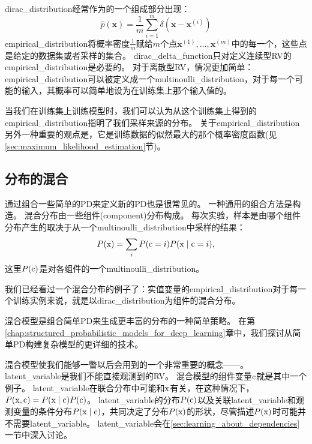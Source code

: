 \gls{dirac_distribution}经常作为的一个组成部分出现：
\begin{equation}
\hat{p}(\bm{x}) = \frac{1}{m} \sum_{i=1}^m \delta(\bm{x} - \bm{x}^{(i)})
\end{equation}
\gls{empirical_distribution}将概率密度$\frac{1}{m}$赋给$m$个点$\bm{x}^{(1)}, \ldots, \bm{x}^{(m)}$中的每一个，这些点是给定的数据集或者采样的集合。
\gls{dirac_delta_function}只对定义连续型\gls{RV}的\gls{empirical_distribution}是必要的。
对于离散型\gls{RV}，情况更加简单：\gls{empirical_distribution}可以被定义成一个\gls{multinoulli_distribution}，对于每一个可能的输入，其概率可以简单地设为在训练集上那个输入值的。

当我们在训练集上训练模型时，我们可以认为从这个训练集上得到的\gls{empirical_distribution}指明了我们采样来源的分布。
关于\gls{empirical_distribution}另外一种重要的观点是，它是训练数据的似然最大的那个概率密度函数(见\ref{sec:maximum_likelihood_estimation}节)。

\subsection{分布的混合}
\label{sec:mixtures_of_distributions}

通过组合一些简单的\gls{PD}来定义新的\gls{PD}也是很常见的。
一种通用的组合方法是构造。
混合分布由一些组件(component)分布构成。
每次实验，样本是由哪个组件分布产生的取决于从一个\gls{multinoulli_distribution}中采样的结果：
\begin{equation}
P(\mathrm{x}) = \sum_i P(\mathrm{c} = i) P(\mathrm{x} \mid \mathrm{c} = i),
\end{equation}
这里$P(\mathrm{c})$是对各组件的一个\gls{multinoulli_distribution}。

我们已经看过一个混合分布的例子了：实值变量的\gls{empirical_distribution}对于每一个训练实例来说，就是以\gls{dirac_distribution}为组件的混合分布。


混合模型是组合简单\gls{PD}来生成更丰富的分布的一种简单策略。
在第\ref{chap:structured_probabilistic_models_for_deep_learning}章中，我们探讨从简单\gls{PD}构建复杂模型的更详细的技术。

混合模型使我们能够一瞥以后会用到的一个非常重要的概念——。
\gls{latent_variable}是我们不能直接观测到的\gls{RV}。
混合模型的组件变量$\mathrm{c}$就是其中一个例子。
\gls{latent_variable}在联合分布中可能和$\mathrm{x}$有关，在这种情况下，$P(\mathrm{x}, \mathrm{c}) = P(\mathrm{x} \mid \mathrm{c})P(\mathrm{c})$。
\gls{latent_variable}的分布$P(\mathrm{c})$以及关联\gls{latent_variable}和观测变量的条件分布$P(\mathrm{x} \mid\mathrm{c})$，共同决定了分布$P(\mathrm{x})$的形状，尽管描述$P(\mathrm{x})$时可能并不需要\gls{latent_variable}。
\gls{latent_variable}会在\ref{sec:learning_about_dependencies}一节中深入讨论。

